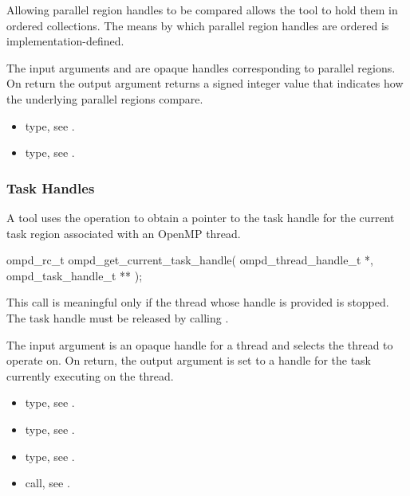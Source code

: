 Allowing parallel region handles to be compared allows the tool to hold them in ordered
collections. The means by which parallel region handles are ordered is implementation-defined.

\argdesc

The input arguments  and  are opaque handles
corresponding to parallel regions.
On return the output argument   returns a signed
integer value that indicates how the underlying parallel regions compare.

\crossreferences
\begin{itemize}
	\item {} type, see 
	.
	\item {} type, see .
\end{itemize}

\subsubsection{Task Handles}

\label{subsubsubsec:ompd_get_current_task_handle}
\summary
A tool uses the  operation to obtain a pointer to the
task handle for the current task region associated with an OpenMP thread.

\format

\begin{cspecific}
\begin{ompSyntax}
ompd_rc_t ompd_get_current_task_handle(
  ompd_thread_handle_t *,
  ompd_task_handle_t **
);
\end{ompSyntax}
\end{cspecific}


\descr
This call is meaningful only if the thread whose handle is provided is stopped.
The task handle must be released by calling .

\argdesc
The input argument  is an opaque handle for a thread and selects the thread to operate on.
On return, the output argument  is set to a handle for the task
currently executing on the thread.

\crossreferences
\begin{itemize}
	\item {} type, see .
	\item {} type, see .
	\item {} type, see .
	\item {} call, see 
	.
\end{itemize}

